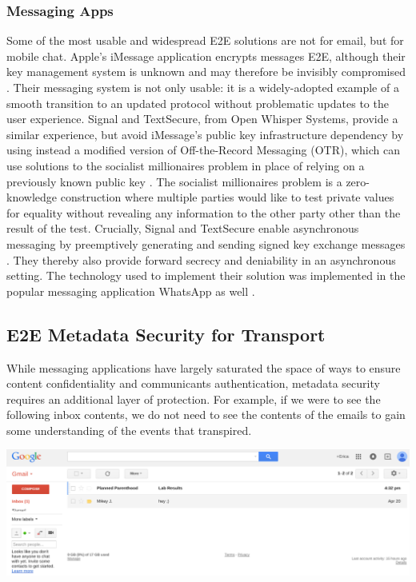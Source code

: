 \documentclass[pageno]{jpaper}
\begin{document}
\subsubsection{Messaging Apps}
Some of the most usable and widespread E2E solutions are not for email, but for mobile chat. Apple's iMessage application encrypts messages E2E, although their key management system is unknown and may therefore be invisibly compromised \cite{imessage}. Their messaging system is not only usable: it is a widely-adopted example of a smooth transition to an updated protocol without problematic updates to the user experience. Signal and TextSecure, from Open Whisper Systems, provide a similar experience, but avoid iMessage's public key infrastructure dependency by using instead a modified version of Off-the-Record Messaging (OTR), which can use solutions to the socialist millionaires problem in place of relying on a previously known public key \cite{borisov2004off}. The socialist millionaires problem is a zero-knowledge construction where multiple parties would like to test private values for equality without revealing any information to the other party other than the result of the test. Crucially, Signal and TextSecure enable asynchronous messaging by preemptively generating and sending signed key exchange messages \cite{whisper}. They thereby also provide forward secrecy and deniability in an asynchronous setting. The technology used to implement their solution was implemented in the popular messaging application WhatsApp as well \cite{whatsapp}.


\subsection{E2E Metadata Security for Transport}
While messaging applications have largely saturated the space of ways to ensure content confidentiality and communicants authentication, metadata security requires an additional layer of protection. For example, if we were to see the following inbox contents, we do not need to see the contents of the emails to gain some understanding of the events that transpired.

\includegraphics[width=\textwidth]{planned}
\end{document}
